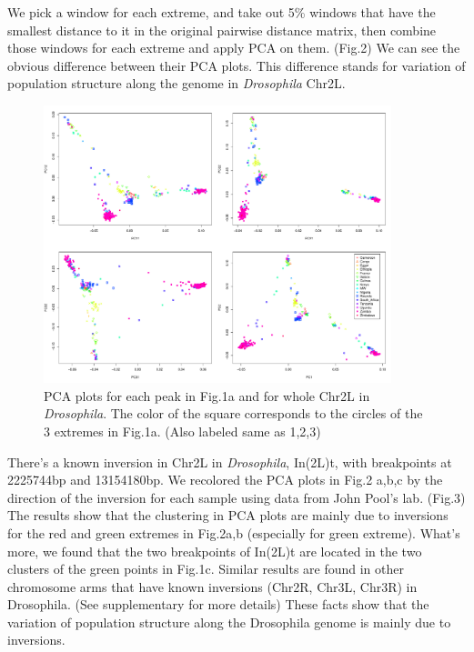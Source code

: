 \documentclass[11pt, oneside]{article}   	%
\begin{document}
\noindent We pick a window for each extreme, and take out 5\% windows that have the smallest distance to it in the original pairwise distance matrix, then combine those windows for each extreme and apply PCA on them. (Fig.2) We can see the obvious difference between their PCA plots. This difference stands for variation of population structure along the genome in \textit{Drosophila} Chr2L.

\begin{figure}
    \begin{center}
       \includegraphics[width=0.9\textwidth]{Fig2_all_pca_plots_for_Chr2L_3peaks}
    \end{center}
    \caption{
         PCA plots for each peak in Fig.1a and for whole Chr2L in \textit{Drosophila}. The color of the square corresponds to the circles of the 3 extremes in Fig.1a. (Also labeled same as 1,2,3)
        \label{fig:pde_clines}
    }
\end{figure}


\noindent There's a known inversion in Chr2L in \textit{Drosophila}, In(2L)t, with breakpoints at 2225744bp and 13154180bp. \citep{corbett2012population} We recolored the PCA plots in Fig.2 a,b,c by the direction of the inversion for each sample using data from John Pool's lab. (Fig.3) The results show that the clustering in PCA plots are mainly due to inversions for the red and green extremes in Fig.2a,b (especially for green extreme). What's more, we found that the two breakpoints of In(2L)t are located in the two clusters of the green points in Fig.1c. Similar results are found in other chromosome arms that have known inversions (Chr2R,
Chr3L, Chr3R) in Drosophila. (See supplementary for more details) These facts show that the variation of population structure along the Drosophila genome is mainly due to inversions.
\end{document}
